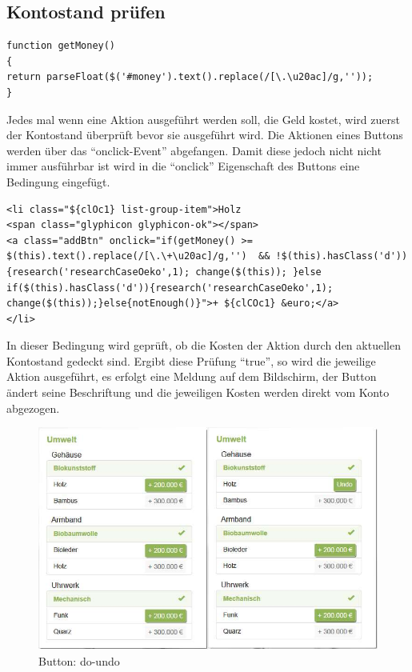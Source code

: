 \subsection*{Kontostand prüfen}

\lstset{language=Java}
\begin{lstlisting}
function getMoney()
{
return parseFloat($('#money').text().replace(/[\.\u20ac]/g,''));
}
\end{lstlisting}

Jedes mal wenn eine Aktion ausgeführt werden soll, die Geld kostet, wird zuerst der Kontostand überprüft bevor sie ausgeführt wird. Die Aktionen eines Buttons werden über das \enquote{onclick-Event} abgefangen. Damit diese jedoch nicht nicht immer ausführbar ist wird in die \enquote{onclick} Eigenschaft des Buttons eine Bedingung eingefügt. 

\lstset{language=HTML}
\begin{lstlisting}
<li class="${clOc1} list-group-item">Holz 
<span class="glyphicon glyphicon-ok"></span>
<a class="addBtn" onclick="if(getMoney() >= $(this).text().replace(/[\.\+\u20ac]/g,'')  && !$(this).hasClass('d')){research('researchCaseOeko',1); change($(this)); }else if($(this).hasClass('d')){research('researchCaseOeko',1); change($(this));}else{notEnough()}">+ ${clCOc1} &euro;</a>
</li>
\end{lstlisting}

In dieser Bedingung wird geprüft, ob die Kosten der Aktion durch den aktuellen Kontostand gedeckt sind. Ergibt diese Prüfung \enquote{true}, so wird die jeweilige Aktion ausgeführt, es erfolgt eine Meldung auf dem Bildschirm, der Button ändert seine Beschriftung und die jeweiligen Kosten werden direkt vom Konto abgezogen.

\begin{figure} [H]
	\centering
	\includegraphics[scale=0.38]{img/button-do-undo.jpeg} 
	\caption{Button: do-undo} \label{fig:abb30}
\end{figure}

